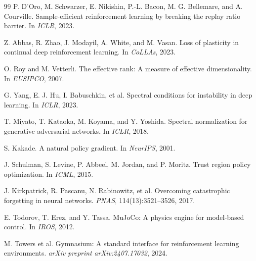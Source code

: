 \documentclass{article}
\begin{document}
\begin{thebibliography}{99}
P. D'Oro, M. Schwarzer, E. Nikishin, P.-L. Bacon, M. G. Bellemare, and A. Courville.
Sample-efficient reinforcement learning by breaking the replay ratio barrier.
In \emph{ICLR}, 2023.

Z. Abbas, R. Zhao, J. Modayil, A. White, and M. Vasan.
Loss of plasticity in continual deep reinforcement learning.
In \emph{CoLLAs}, 2023.

O. Roy and M. Vetterli.
The effective rank: A measure of effective dimensionality.
In \emph{EUSIPCO}, 2007.

G. Yang, E. J. Hu, I. Babuschkin, et al.
Spectral conditions for instability in deep learning.
In \emph{ICLR}, 2023.

T. Miyato, T. Kataoka, M. Koyama, and Y. Yoshida.
Spectral normalization for generative adversarial networks.
In \emph{ICLR}, 2018.

S. Kakade.
A natural policy gradient.
In \emph{NeurIPS}, 2001.

J. Schulman, S. Levine, P. Abbeel, M. Jordan, and P. Moritz.
Trust region policy optimization.
In \emph{ICML}, 2015.

J. Kirkpatrick, R. Pascanu, N. Rabinowitz, et al.
Overcoming catastrophic forgetting in neural networks.
\emph{PNAS}, 114(13):3521--3526, 2017.

E. Todorov, T. Erez, and Y. Tassa.
MuJoCo: A physics engine for model-based control.
In \emph{IROS}, 2012.

M. Towers et al.
Gymnasium: A standard interface for reinforcement learning environments.
\emph{arXiv preprint arXiv:2407.17032}, 2024.

\end{thebibliography}
\end{document}
